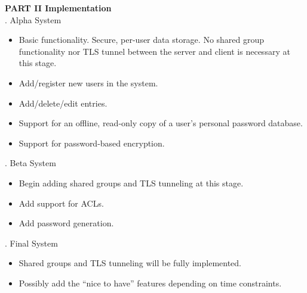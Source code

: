\documentclass[11pt, letterpaper]{article}
\newcommand{\DesignSection}[1]
{\noindent\textbf{#1}\\}
\begin{document}
\DesignSection{PART II Implementation}
. Alpha System
\begin{itemize} \itemsep1pt \parskip0pt 
\item Basic functionality. Secure, per-user data storage. No shared group functionality nor TLS tunnel between the server and client is necessary at this stage.
\item Add/register new users in the system.
\item Add/delete/edit entries.
\item Support for an offline, read-only copy of a user’s personal password database.
\item Support for password-based encryption.
\end{itemize}
. Beta System
\begin{itemize} \itemsep1pt \parskip0pt 
\item Begin adding shared groups and TLS tunneling at this stage.
\item Add support for ACLs.
\item Add password generation.
\end{itemize}
. Final System
\begin{itemize} \itemsep1pt \parskip0pt 
\item Shared groups and TLS tunneling will be fully implemented.
\item Possibly add the “nice to have” features depending on time constraints.
\end{itemize}
\end{document}
